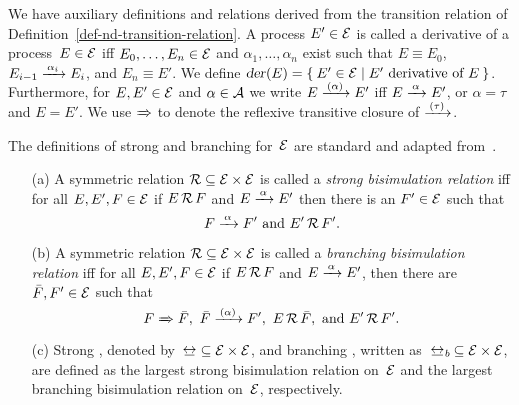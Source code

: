 \medskip

\noindent
We have auxiliary definitions and relations derived from the
transition relation of Definition~\ref{def-nd-transition-relation}.
%
A process $E' \in \mathcal{E}$ is called a derivative of a process~$E \in
\mathcal{E}$ iff $E_0, \ldots, E_n \in \mathcal{E}$ and $\alpha_1, \ldots,
\alpha_n$ exist such that $E \equiv E_0$, $E_{i{-}1} \arrow{\alpha_i}
E_i$, and $E_n \equiv E'$.
%
We define $\textsl{der} \mkern1mu(E) = \lbrace \: E' \in \mathcal{E} \mid \mbox{$E'$ derivative of~$E$}
\: \rbrace$.
%
Furthermore, for $E, E' \in \mathcal{E}$ and $\alpha \in \mathcal{A}$ we write $E
\alphahidearrow E'$ iff $E \alphaarrow E'$, or $\alpha = \tau$ and $E
= E'$. We use $\Arrow{}$ to denote the reflexive transitive closure of
$\arrow{(\tau)}$.

The definitions of strong and branching {\bisimilarity} for~$\mathcal{E}$ are
standard and adapted from~\cite{GW96:jacm,Mil89:phi}.

\begin{definition}
  \label{def-branching-bisimilar}
  \begin{itemize}
  \item [(a)] A symmetric relation $\mathcal{R} \subseteq \mathcal{E} \times
    \mathcal{E}$ is called a \textit{strong bisimulation relation} iff for all
    $E, E', F \in \mathcal{E}$ if $E \,{\mathcal{R}}\, F$ and $E
    \arrow{\alpha} E'$ then there is an $F' \in \mathcal{E}$ such that
    \begin{displaymath}
      F \alphaarrow F' \ \text{and} \ 
      E' \mopcalR F'.
    \end{displaymath}
  \item [(b)] A symmetric relation $\mathcal{R} \subseteq \mathcal{E} \times
    \mathcal{E}$ is called a \textit{branching bisimulation relation} iff for
    all $E, E', F \in \mathcal{E}$ if $E \,{\mathcal{R}}\, F$ and $E
    \arrow{\alpha} E'$, then there are $\bar{F}, F' \in \mathcal{E}$ such that
    \begin{displaymath}
      F \Arrow{} \Fbar, \ 
      \Fbar \alphahidearrow F', \ 
      E \mopcalR \Fbar, \ \text{and} \ 
      E' \mopcalR F'.
    \end{displaymath}
  \item [(c)] Strong {\bisimilarity}, denoted by~${\bisim} \subseteq \calE
    \times \calE$, and branching {\bisimilarity}, written as~${\brbisim}
    \subseteq \calE \times \calE$, are defined as the largest strong
    bisimulation relation on~$\mathcal{E}$ and the largest branching
    bisimulation relation on~$\mathcal{E}$, respectively.
  \end{itemize}
\end{definition}

